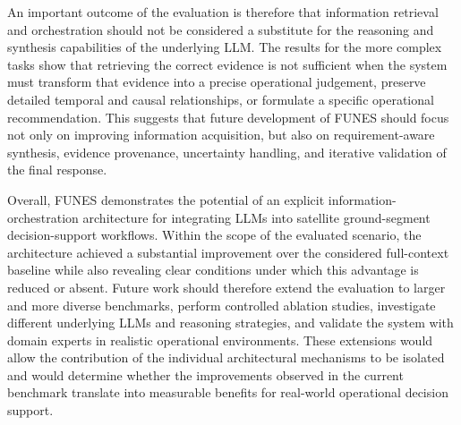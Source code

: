 An important outcome of the evaluation is therefore that information retrieval and orchestration should not be considered a substitute for the reasoning and synthesis capabilities of the underlying LLM. The results for the more complex tasks show that retrieving the correct evidence is not sufficient when the system must transform that evidence into a precise operational judgement, preserve detailed temporal and causal relationships, or formulate a specific operational recommendation. This suggests that future development of FUNES should focus not only on improving information acquisition, but also on requirement-aware synthesis, evidence provenance, uncertainty handling, and iterative validation of the final response.

Overall, FUNES demonstrates the potential of an explicit information-orchestration architecture for integrating LLMs into satellite ground-segment decision-support workflows. Within the scope of the evaluated scenario, the architecture achieved a substantial improvement over the considered full-context baseline while also revealing clear conditions under which this advantage is reduced or absent. Future work should therefore extend the evaluation to larger and more diverse benchmarks, perform controlled ablation studies, investigate different underlying LLMs and reasoning strategies, and validate the system with domain experts in realistic operational environments. These extensions would allow the contribution of the individual architectural mechanisms to be isolated and would determine whether the improvements observed in the current benchmark translate into measurable benefits for real-world operational decision support.